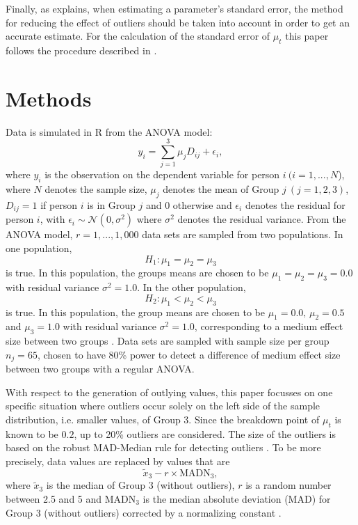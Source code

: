 \documentclass[11pt, a4paper]{article}
\begin{document}
Finally, as \citet[p.~5]{Wilcox2017} explains, when estimating a parameter's standard error, the method for reducing the effect of outliers should be taken into account in order to get an accurate estimate. 
For the calculation of the standard error of $\mu_t$ this paper follows the procedure described in \citet[pp.~60-64]{Wilcox2017}.

\section{Methods}
\label{section: Methods}
Data is simulated in R \citep{R2016} from the ANOVA model:
\begin{equation}
y_{i} = \sum_{j=1}^{3}\mu_jD_{ij} + \epsilon_i,
\end{equation}
where $y_i$ is the observation on the dependent variable for person $i \ (i = 1, ..., N$), where $N$ denotes the sample size, $\mu_j$ denotes the mean of Group $j \ (j = 1, 2, 3)$, $D_{ij} = 1$ if person $i$ is in Group $j$ and $0$ otherwise and $\epsilon_{i}$ denotes the residual for person $i$, with $\epsilon_{i} \sim \mathcal{N}(0, \sigma^2)$ where $\sigma^2$ denotes the residual variance. 
From the ANOVA model, $r = 1, ..., 1,000$ data sets are sampled from two populations. In one population, 
\begin{equation}
H_1: \mu_1 = \mu_2 = \mu_3
\label{H1}
\end{equation}
is true. In this population, the groups means are chosen to be $\mu_1 = \mu_2 = \mu_3 = 0.0$ with residual variance $\sigma^2 = 1.0$.
In the other population, 
\begin{equation}
H_2: \mu_1 < \mu_2 < \mu_3
\label{H2}
\end{equation}
is true. In this population, the group means are chosen to be $\mu_1 = 0.0, \, \mu_2 = 0.5$ and $\mu_3 = 1.0$ with residual variance $\sigma^2 = 1.0$, corresponding to a medium effect size between two groups \citep{Cohen1988}. 
Data sets are sampled with sample size per group $n_j = 65$, chosen to have 80\% power to detect a difference of medium effect size between two groups with a regular ANOVA.

With respect to the generation of outlying values, this paper focusses on one specific situation where outliers occur solely on the left side of the sample distribution, i.e. smaller values, of Group 3. 
Since the breakdown point of $\mu_t$ is known to be $0.2$, up to 20\% outliers are considered. The size of the outliers is based on the robust MAD-Median rule for detecting outliers \citep[p.101]{Wilcox2017}. 
To be more precisely, data values are replaced by values that are
\begin{equation}
\tilde{x}_3 - r \times \mathrm{MADN}_3,
\end{equation}
where $\tilde{x}_3$ is the median of Group 3 (without outliers), $r$ is a random number between 2.5 and 5 and $\mathrm{MADN}_3$ is the median absolute deviation (MAD) for Group 3 (without outliers) corrected by a normalizing constant \citep[p.~50]{Wilcox2017}.
\end{document}
